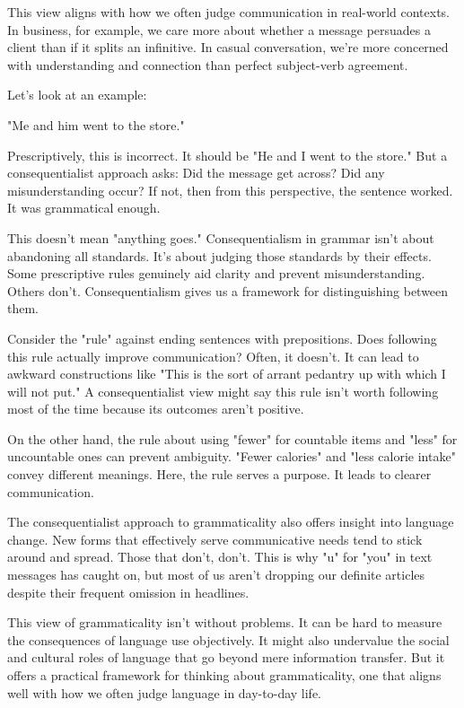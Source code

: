 This view aligns with how we often judge communication in real-world contexts. In business, for example, we care more about whether a message persuades a client than if it splits an infinitive. In casual conversation, we're more concerned with understanding and connection than perfect subject-verb agreement.

Let's look at an example:

"Me and him went to the store."

Prescriptively, this is incorrect. It should be "He and I went to the store." But a consequentialist approach asks: Did the message get across? Did any misunderstanding occur? If not, then from this perspective, the sentence worked. It was grammatical enough.

This doesn't mean "anything goes." Consequentialism in grammar isn't about abandoning all standards. It's about judging those standards by their effects. Some prescriptive rules genuinely aid clarity and prevent misunderstanding. Others don't. Consequentialism gives us a framework for distinguishing between them.

Consider the "rule" against ending sentences with prepositions. Does following this rule actually improve communication? Often, it doesn't. It can lead to awkward constructions like "This is the sort of arrant pedantry up with which I will not put." A consequentialist view might say this rule isn't worth following most of the time because its outcomes aren't positive.

On the other hand, the rule about using "fewer" for countable items and "less" for uncountable ones can prevent ambiguity. "Fewer calories" and "less calorie intake" convey different meanings. Here, the rule serves a purpose. It leads to clearer communication.

The consequentialist approach to grammaticality also offers insight into language change. New forms that effectively serve communicative needs tend to stick around and spread. Those that don't, don't. This is why "u" for "you" in text messages has caught on, but most of us aren't dropping our definite articles despite their frequent omission in headlines.

This view of grammaticality isn't without problems. It can be hard to measure the consequences of language use objectively. It might also undervalue the social and cultural roles of language that go beyond mere information transfer. But it offers a practical framework for thinking about grammaticality, one that aligns well with how we often judge language in day-to-day life.

